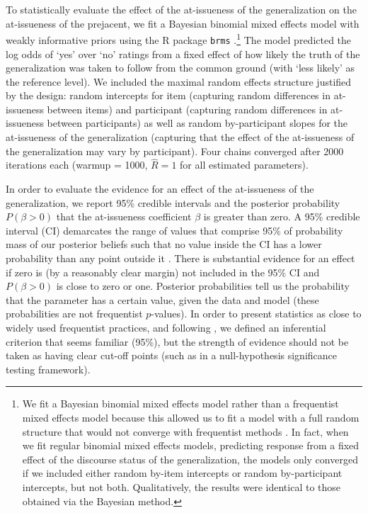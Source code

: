 \documentclass[11pt,fleqn]{article}
\newcommand{\6}{\mbox{$[\hspace*{-.6mm}[$}}
\newcommand{\9}{\mbox{$]\hspace*{-.6mm}]$}}
\begin{document}
To statistically evaluate the effect of the at-issueness of the generalization on the at-issueness of the prejacent, we fit a Bayesian binomial mixed effects model with weakly informative priors using the R package \verb|brms| \citep{buerkner2017}.\footnote{We fit a Bayesian binomial mixed effects model rather than a frequentist mixed effects model because this allowed us to fit a model with a full random structure that would not converge with frequentist
methods \citep{Nicenboim2016}. In fact, when we fit regular binomial mixed effects models, predicting response from a fixed effect of the discourse status of the generalization, the models only converged if we included either random by-item intercepts or random by-participant intercepts, but not both. Qualitatively, the results were identical to those obtained via the Bayesian method.} The model predicted the log odds of `yes' over `no' ratings from a fixed effect of how likely the truth of the generalization was taken to follow from the common ground (with `less likely' as the reference level). We included the maximal random effects structure justified by the design: random intercepts for item (capturing random differences in at-issueness between items) and participant (capturing random differences in at-issueness between participants) as well as random by-participant slopes for the at-issueness of the generalization (capturing that the effect of the at-issueness of the generalization may vary by participant). Four chains converged after 2000 iterations each (warmup = 1000, \(\hat{R}=1\) for all estimated parameters).

In order to evaluate the evidence for an effect of the at-issueness of the generalization, we report 95\% credible intervals and the posterior probability $P(\beta > 0)$ that the at-issueness coefficient $\beta$ is greater than zero. A 95\% credible interval (CI) demarcates the range of values that comprise 95\% of probability mass of our posterior beliefs such that no value inside the CI has a lower probability than any point outside it \citep{Jaynes1976, Morey2016}. There is substantial evidence for an effect if zero is (by a reasonably clear margin) not included in the 95\% CI and $P(\beta > 0)$ is close to zero or one. Posterior probabilities tell us the probability that the parameter has a certain value, given the data and model (these probabilities are not frequentist $p$-values). In order to present statistics as close to widely used frequentist practices, and following \citealt{Nicenboim2016}, we defined an inferential criterion that seems familiar (95\%), but the strength of evidence should not be taken as having clear cut-off points (such as in a null-hypothesis significance testing framework).
\end{document}
